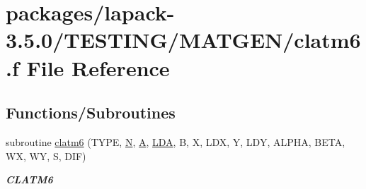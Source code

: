 \hypertarget{clatm6_8f}{}\section{packages/lapack-\/3.5.0/\+T\+E\+S\+T\+I\+N\+G/\+M\+A\+T\+G\+E\+N/clatm6.f File Reference}
\label{clatm6_8f}
\subsection*{Functions/\+Subroutines}
\begin{DoxyCompactItemize}
\item 
subroutine \hyperlink{group__complex__matgen_gae9d75b31c19f718d006ac8059071b253}{clatm6} (T\+Y\+P\+E, \hyperlink{polmisc_8c_a0240ac851181b84ac374872dc5434ee4}{N}, \hyperlink{classA}{A}, \hyperlink{example__user_8c_ae946da542ce0db94dced19b2ecefd1aa}{L\+D\+A}, B, X, L\+D\+X, Y, L\+D\+Y, A\+L\+P\+H\+A, B\+E\+T\+A, W\+X, W\+Y, S, D\+I\+F)
\begin{DoxyCompactList}\small\item\em {\bfseries C\+L\+A\+T\+M6} \end{DoxyCompactList}\end{DoxyCompactItemize}
